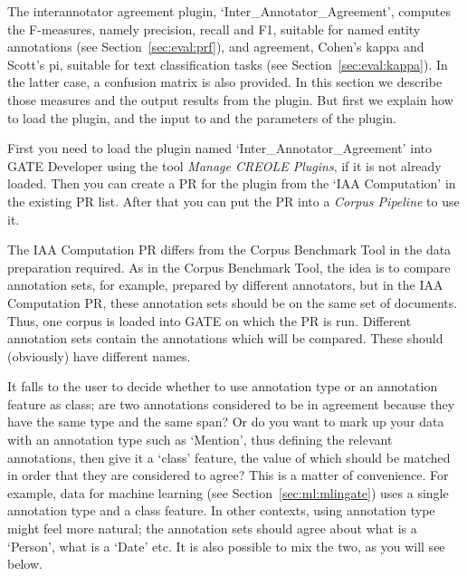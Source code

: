 
The interannotator agreement plugin, `Inter\_Annotator\_Agreement', computes the
F-measures, namely precision, recall and F1, suitable for named entity
annotations (see Section~\ref{sec:eval:prf}), and agreement, Cohen's kappa and
Scott's pi, suitable for text classification tasks (see
Section~\ref{sec:eval:kappa}). In the latter case, a confusion matrix is also
provided. In this section we describe those measures and the output results from
the plugin. But first we explain how to load the plugin, and the input to and the
parameters of the plugin.

First you need to load the plugin named `Inter\_Annotator\_Agreement' into
GATE Developer using the tool {\em Manage CREOLE Plugins}, if it is not
already loaded.  Then you can create a PR for the plugin from the
`IAA Computation' in the existing PR list. After that you can put
the PR into a {\em Corpus Pipeline} to use it.

The IAA Computation PR differs from the Corpus Benchmark Tool in the data
preparation required. As in the Corpus Benchmark Tool, the idea is to compare
annotation sets, for example, prepared by different annotators, but in the IAA
Computation PR, these annotation sets should be on the same set of documents.
Thus, one corpus is loaded into GATE on which the PR is run. Different annotation
sets contain the annotations which will be compared. These should (obviously)
have different names.

It falls to the user to decide whether to use annotation type or an annotation
feature as class; are two annotations considered to be in agreement because they
have the same type and the same span? Or do you want to mark up your data with
an annotation type such as `Mention', thus defining the relevant annotations,
then give it a `class' feature, the value of which should be matched in order
that they are considered to agree? This is a matter of convenience. For example,
data for machine learning (see Section~\ref {sec:ml:mlingate}) uses a single
annotation type and a class feature. In other contexts, using annotation type
might feel more natural; the annotation sets should agree about what is a
`Person', what is a `Date' etc. It is also possible to mix the two, as you will
see below.

